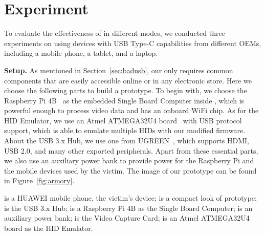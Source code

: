\section{Experiment}
\label{sec:experiment}


To evaluate the effectiveness of \tool in different modes, we conducted three
experiments on \tool using devices with \ac{USB} Type-C capabilities from different
\acp{OEM}, including a mobile phone, a tablet, and a laptop.

\textbf{Setup.}
As mentioned in Section~\ref{sec:badusb},
our \tool only requires common components that are easily accessible online or
in any electronic store. Here we choose the following parts to build a
prototype. To begin with, we choose the Raspberry Pi 4B~\cite{pi4b} as the embedded Single Board
Computer inside \tool, which is powerful enough to process video data and has
an onboard WiFi chip. As for the \ac{HID} Emulator, we use an Atmel ATMEGA32U4 board~\cite{atmel}
with \ac{USB} protocol support, which is able to emulate multiple \acp{HID}
with our modified firmware. About the \ac{USB} 3.x Hub, we use one from 
UGREEN~\cite{ugreen}, which supports HDMI, \ac{USB} 2.0, and many other exported peripherals.
Apart from these essential parts, we also use an auxiliary power bank to
provide power for the Raspberry Pi and the mobile devices used by the victim.
The image of our \tool prototype can be found in Figure~\ref{fig:armory}.

 is a HUAWEI mobile phone, the victim's device;  is a compact look of \tool prototype;  is the \ac{USB} 3.x Hub;  is a Raspberry Pi 4B as the Single Board Computer;  is an auxiliary power bank;  is the Video Capture Card;  is an Atmel ATMEGA32U4 board as the \ac{HID} Emulator.



